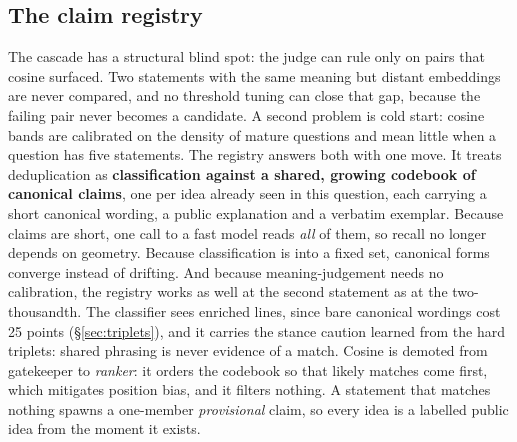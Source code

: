\documentclass{article}
\begin{document}
\subsection{The claim registry}
\label{sec:registry}
The cascade has a structural blind spot: the judge can rule only on pairs that cosine surfaced. Two statements with the same meaning but distant embeddings are never compared, and no threshold tuning can close that gap, because the failing pair never becomes a candidate. A second problem is cold start: cosine bands are calibrated on the density of mature questions and mean little when a question has five statements. The registry answers both with one move. It treats deduplication as \textbf{classification against a shared, growing codebook of canonical claims}, one per idea already seen in this question, each carrying a short canonical wording, a public explanation and a verbatim exemplar. Because claims are short, one call to a fast model reads \emph{all} of them, so recall no longer depends on geometry. Because classification is into a fixed set, canonical forms converge instead of drifting. And because meaning-judgement needs no calibration, the registry works as well at the second statement as at the two-thousandth. The classifier sees enriched lines, since bare canonical wordings cost 25 points (\S\ref{sec:triplets}), and it carries the stance caution learned from the hard triplets: shared phrasing is never evidence of a match. Cosine is demoted from gatekeeper to \emph{ranker}: it orders the codebook so that likely matches come first, which mitigates position bias, and it filters nothing. A statement that matches nothing spawns a one-member \emph{provisional} claim, so every idea is a labelled public idea from the moment it exists.
\end{document}
